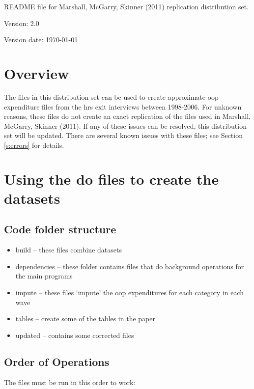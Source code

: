 \documentclass[12pt]{article}
\begin{document}
	\begin{flushleft}
		README file for Marshall, McGarry, Skinner (2011) replication distribution set.
		
		Version: 2.0
		
		Version date: \today 
	\end{flushleft}
	
	
	\section{Overview}
	The files in this distribution set can be used to create approximate \gls{oop} expenditure files from the \gls{hrs} exit interviews between 1998-2006. For unknown reasons, these files do not create an exact replication of the files used in Marshall, McGarry, Skinner (2011). If any of these issues can be resolved, this distribution set will be updated. There are several known issues with these files; see Section \ref{s:errors} for details.
	
	\section{Using the do files to create the datasets}
	
	\subsection{Code folder structure}
	
	\begin{itemize}
		\item build -- these files combine datasets
		\item dependencies -- these folder contains files that do background operations for the main programs
		\item impute -- these files `impute' the \gls{oop} expenditures for each category in each wave
		\item tables -- create some of the tables in the paper
		\item updated -- contains some corrected files
	\end{itemize}
	
	\subsection{Order of Operations}
	
	The files must be run in this order to work:
	
\end{document}

